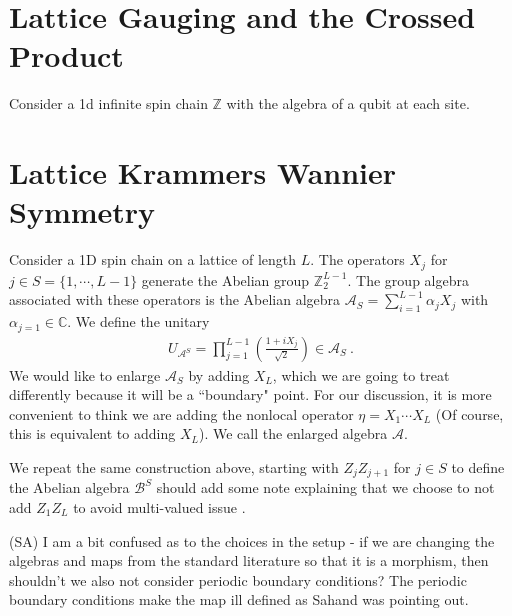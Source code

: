 \documentclass{article}
\newcommand{\mA}{\mathcal{A}}
\newcommand{\mB}{\mathcal{B}}
\newcommand{\lb}{\left(}
\newcommand{\rb}{\right)}
\theoremstyle{definition}
\newcommand{\SA}[1]{{\color{sulaiman}\footnotesize{(SA) #1}}}
\begin{document}
\section{Lattice Gauging and the Crossed Product}

Consider a 1d infinite spin chain $\mathbb{Z}$ with the algebra of a qubit at each site.

  \section{Lattice Krammers Wannier Symmetry}
  \label{sec:LatticeKW}

  Consider a 1D spin chain on a lattice of length $L$. The operators $X_{j}$ for
  $j\in S=\{1,\cdots, L-1\}$ generate the Abelian group $\mathbb{Z}_{2}^{L-1}$. The
  group algebra associated with these operators is the Abelian algebra $\mA_{S}=\sum
  _{i=1}^{L-1}\alpha_{j}X_{j}$ with $\alpha_{j=1}\in\mathbb{C}$. We define the
  unitary
  \begin{eqnarray}
    U_{\mA^S}=\prod_{j=1}^{L-1}\lb \frac{1+i X_{j}}{\sqrt{2}}\rb\in \mA_S\ .
  \end{eqnarray}
  We would like to enlarge $\mA_{S}$ by adding $X_{L}$, which we are going to treat
  differently because it will be a ``boundary" point. For our discussion, it is
  more convenient to think we are adding the nonlocal operator
  $\eta=X_{1}\cdots X_{L}$ (Of course, this is equivalent to adding $X_{L}$). We
  call the enlarged algebra $\mA$.

  We repeat the same construction above, starting with $Z_{j}Z_{j+1}$ for $j\in S$
  to define the Abelian algebra $\mB^{S}$
  \color{brown}
  should add some note explaining that we choose to not add $Z_{1}Z_{L}$ to avoid
  multi-valued issue
  \color{black}
  .

  \SA{I am a bit confused as to the choices in the setup - if we are changing the algebras and maps from the standard literature so that it is a morphism, then shouldn't we also not consider periodic boundary conditions?  The periodic boundary conditions make the map ill defined as Sahand was pointing out.}

\end{document}

